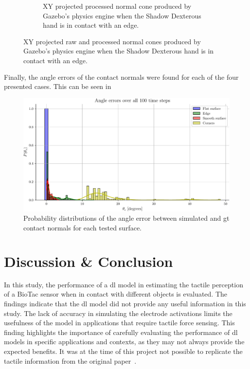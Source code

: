 \begin{figure}[!h]
\begin{subfigure}[b]{0.48\textwidth}
		\caption{XY projected processed normal cone produced by Gazebo's physics engine when the Shadow Dexterous hand is in contact with an edge.}
		\label{fig:xy-projected-processed-normal-cones}
	\end{subfigure}
		\caption{XY projected raw and processed normal cones produced by Gazebo's physics engine when the Shadow Dexterous hand is in contact with an edge.}
		\label{fig:xy-projected-processed-normal-normal-cones}
\end{figure}

Finally, the angle errors  of the contact normals were found for each of the four presented cases. This can be seen in~

\begin{figure}[!h]
	\begin{center}
		\includegraphics[width=\textwidth]{chapters/1-tactile-perception/fig/matplotlib/histogram-normal-errors.pdf}
	\end{center}
	\caption{Probability distributions of the angle error  between simulated and \gls{gt} contact normals for each tested surface.}
	\label{fig:histogram-normal-errors}
\end{figure}

\newpage
\section{Discussion \& Conclusion}\label{sec:1-tactile-perception-discussion-and-conclusion}

In this study, the performance of a \gls{dl} model in estimating the tactile perception of a BioTac sensor when in contact with different objects is evaluated. The findings indicate that the \gls{dl} model did not provide any useful information in this study. The lack of accuracy in simulating the electrode activations limits the usefulness of the model in applications that require tactile force sensing. This finding highlights the importance of carefully evaluating the performance of \gls{dl} models in specific applications and contexts, as they may not always provide the expected benefits. It was at the time of this project not possible to replicate the tactile information from the original paper~\cite{simulation-of-the-syntouch-biotac-sensor}. \medskip

